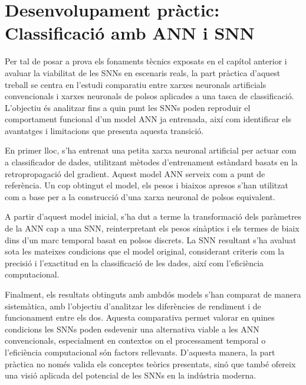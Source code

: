 \documentclass[a4paper,11pt, titlepage, twoside]{article}
\begin{document}
\section{Desenvolupament pràctic: Classificació amb ANN i SNN}

Per tal de posar a prova els fonaments tècnics exposats en el capítol anterior i avaluar la viabilitat de les SNNs en escenaris reals, la part pràctica d'aquest treball se centra en l'estudi comparatiu entre xarxes neuronals artificials convencionals i xarxes neuronals de polsos aplicades a una tasca de classificació. L'objectiu és analitzar fins a quin punt les SNNs poden reproduir el comportament funcional d'un model ANN ja entrenada, així com identificar els avantatges i limitacions que presenta aquesta transició.

En primer lloc, s'ha entrenat una petita xarxa neuronal artificial per actuar com a classificador de dades, utilitzant mètodes d'entrenament estàndard basats en la retropropagació del gradient. Aquest model ANN serveix com a punt de referència. Un cop obtingut el model, els pesos i biaixos apresos s'han utilitzat com a base per a la construcció d'una xarxa neuronal de polsos equivalent.

A partir d'aquest model inicial, s'ha dut a terme la transformació dels paràmetres de la ANN cap a una SNN, reinterpretant els pesos sinàptics i els termes de biaix dins d'un marc temporal basat en polsos discrets. La SNN resultant s'ha avaluat sota les mateixes condicions que el model original, considerant criteris com la precisió i l'exactitud en la classificació de les dades, així com l'eficiència computacional.

Finalment, els resultats obtinguts amb ambdós models s'han comparat de manera sistemàtica, amb l'objectiu d'analitzar les diferències de rendiment i de funcionament entre els dos. Aquesta comparativa permet valorar en quines condicions les SNNs poden esdevenir una alternativa viable a les ANN convencionals, especialment en contextos on el processament temporal o l'eficiència computacional són factors rellevants. D'aquesta manera, la part pràctica no només valida els conceptes teòrics presentats, sinó que també ofereix una visió aplicada del potencial de les SNNs en la indústria moderna.
\end{document}
